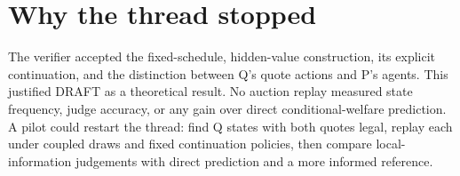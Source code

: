 \documentclass{article}
\begin{document}
\section{Why the thread stopped}

The verifier accepted the fixed-schedule, hidden-value construction, its explicit continuation, and the
distinction between Q's quote actions and P's agents. This justified DRAFT as a theoretical result. No
auction replay measured state frequency, judge accuracy, or any gain over direct conditional-welfare
prediction. A pilot could restart the thread: find Q states with both quotes legal, replay each under coupled
draws and fixed continuation policies, then compare local-information judgements with direct prediction and
a more informed reference.



\end{document}
